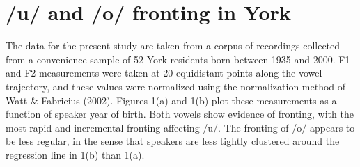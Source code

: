 \documentclass[PWPL]{article}
\begin{document}
\section{/u/ and /o/ fronting in York}
The data for the present study are taken from a corpus of recordings collected from a convenience sample of 52 York residents born between 1935 and 2000. F1 and F2 measurements were taken at 20 equidistant points along the vowel trajectory, and these values were normalized using the normalization method of Watt \& Fabricius (2002). Figures 1(a) and 1(b) plot these measurements as a function of speaker year of birth. Both vowels show evidence of fronting, with the most rapid and incremental fronting affecting /u/. The fronting of /o/ appears to be less regular, in the sense that speakers are less tightly clustered around the regression line in 1(b) than 1(a).
\end{document}

